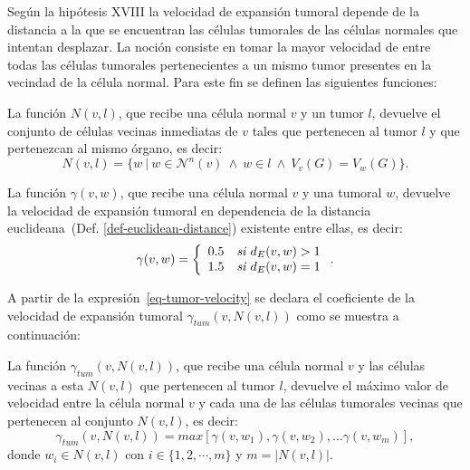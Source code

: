 Seg\'un la hip\'otesis XVIII la velocidad de expansi\'on tumoral depende de la distancia a la que se encuentran las c\'elulas tumorales de las c\'elulas normales que intentan desplazar. La noci\'on consiste en tomar la mayor velocidad de entre todas las c\'elulas tumorales pertenecientes a un mismo tumor presentes en la vecindad de la c\'elula normal. Para este fin se definen las siguientes funciones:

\begin{definition}
\label{def-tumor-neighbourhood}
La funci\'on $N(v,l)$, que recibe una c\'elula normal $v$ y un tumor $l$, devuelve el conjunto de c\'elulas vecinas inmediatas de $v$ tales que pertenecen al tumor $l$ y que pertenezcan al mismo \'organo, es decir:
\begin{equation}
N(v,l) = \lbrace w~|~w \in \mathcal{N}^n(v)~\wedge~w \in l~\wedge~V_v(G) = V_w(G) \rbrace. \label{eq-tumor-neighbourhood}
\end{equation}
\end{definition}

\begin{definition}
\label{def-tumor-velocity}
La funci\'on $\gamma(v,w)$, que recibe una c\'elula normal $v$ y una tumoral $w$, devuelve la velocidad de expansi\'on tumoral en dependencia de la distancia euclideana~(Def. \ref{def-euclidean-distance}) existente entre ellas, es decir:
\begin{equation}
\gamma(v,w) = \left\lbrace
	\begin{array}{ll}
		0$.$5 & \textit{si } d_E(v,w) > 1 \\
		1$.$5 & \textit{si } d_E(v,w) = 1 
	\end{array}
\right.. \label{eq-tumor-velocity}
\end{equation}
\end{definition}

A partir de la expresi\'on~\ref{eq-tumor-velocity} se declara el coeficiente de la velocidad de expansi\'on tumoral $\gamma_{tum}(v,N(v,l))$ como se muestra a continuaci\'on:

\begin{definition}
\label{def-velocity-function}
La funci\'on $\gamma_{tum}(v,N(v,l))$, que recibe una c\'elula normal $v$ y las c\'elulas vecinas a esta $N(v,l)$ que pertenecen al tumor $l$, devuelve el m\'aximo valor de velocidad entre la c\'elula normal $v$ y cada una de las c\'elulas tumorales vecinas que pertenecen al conjunto $N(v,l)$, es decir:
\begin{equation}
\gamma_{tum}(v,N(v,l)) = max\left[\gamma(v,w_1), \gamma(v,w_2), \ldots \gamma(v,w_m) \right], \label{eq-velocity-function}
\end{equation}
donde $w_i \in N(v,l)$ con $i \in \lbrace 1,2,\cdots,m \rbrace$ y $m=|N(v,l)|$.
\end{definition}

